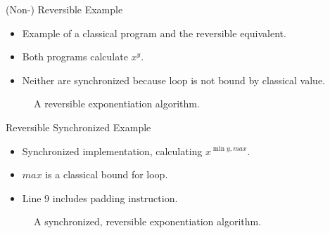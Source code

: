 \begin{frame}{(Non-) Reversible Example}
    \begin{itemize}
        \item Example of a classical program and the reversible equivalent.
        \item Both programs calculate $x^y$. 
        \item Neither are synchronized because loop is not bound by classical value.
    \end{itemize}
    \begin{figure}[htp]
        \centering     
        \begin{minipage}{.40\textwidth}
            
            \caption{A non-reversible exponentiation algorithm.}
            \label{fig:qcm_not_reverse}
        \end{minipage}
        \hfill
        \begin{minipage}{.50\textwidth}
            
            \caption{A reversible exponentiation algorithm.}    
            \label{fig:qcm_reverse}
        \end{minipage}
    \end{figure}
\end{frame}

\begin{frame}{Reversible Synchronized Example}
    \begin{itemize}
        \item Synchronized implementation, calculating $x^{\min{y, max}}$.
        \item $max$ is a classical bound for loop.
        \item Line $9$ includes padding instruction.
    \end{itemize}
    \begin{figure}[htp]
        \centering     
        
        \caption{A synchronized, reversible exponentiation algorithm.}
        \label{fig:qcm_sync}
    \end{figure}
\end{frame}